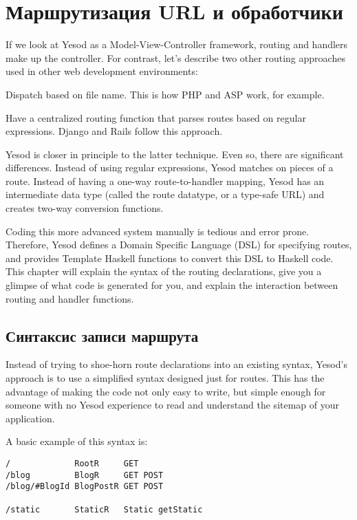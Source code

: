 \chapter{Маршрутизация URL и обработчики}

If we look at Yesod as a Model-View-Controller framework, routing and
handlers make up the controller. For contrast, let's describe two
other routing approaches used in other web development environments:

Dispatch based on file name. This is how PHP and ASP work, for example.

Have a centralized routing function that parses routes based on
regular expressions. Django and Rails follow this approach.

Yesod is closer in principle to the latter technique. Even so, there
are significant differences. Instead of using regular expressions,
Yesod matches on pieces of a route. Instead of having a one-way
route-to-handler mapping, Yesod has an intermediate data type (called
the route datatype, or a type-safe URL) and creates two-way conversion
functions.

Coding this more advanced system manually is tedious and error
prone. Therefore, Yesod defines a Domain Specific Language (DSL) for
specifying routes, and provides Template Haskell functions to convert
this DSL to Haskell code. This chapter will explain the syntax of the
routing declarations, give you a glimpse of what code is generated for
you, and explain the interaction between routing and handler
functions.

\section{Синтаксис записи маршрута}

Instead of trying to shoe-horn route declarations into an existing
syntax, Yesod's approach is to use a simplified syntax designed just
for routes. This has the advantage of making the code not only easy to
write, but simple enough for someone with no Yesod experience to read
and understand the sitemap of your application.

A basic example of this syntax is:

\begin{verbatim}
/             RootR     GET
/blog         BlogR     GET POST
/blog/#BlogId BlogPostR GET POST

/static       StaticR   Static getStatic
\end{verbatim}


